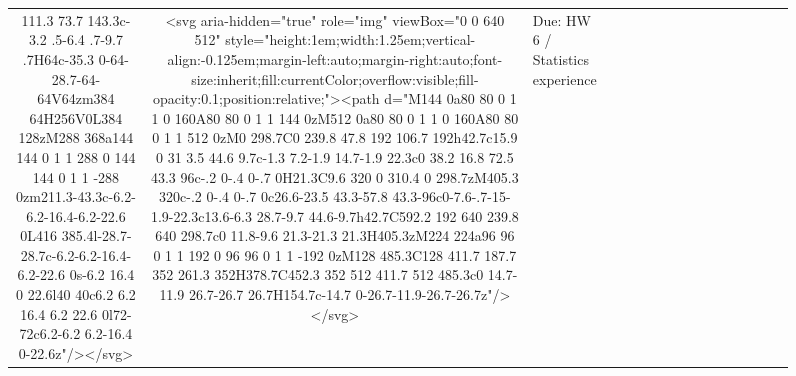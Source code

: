 \documentclass[
]{article}
\begin{document}
\begin{figure*}
\begin{longtable*}{cclllccccccccccl}
111.3 73.7 143.3c-3.2 .5-6.4 .7-9.7 .7H64c-35.3 0-64-28.7-64-64V64zm384 64H256V0L384 128zM288 368a144 144 0 1 1 288 0 144 144 0 1 1 -288 0zm211.3-43.3c-6.2-6.2-16.4-6.2-22.6 0L416 385.4l-28.7-28.7c-6.2-6.2-16.4-6.2-22.6 0s-6.2 16.4 0 22.6l40 40c6.2 6.2 16.4 6.2 22.6 0l72-72c6.2-6.2 6.2-16.4 0-22.6z"/></svg> & <svg aria-hidden="true" role="img" viewBox="0 0 640 512" style="height:1em;width:1.25em;vertical-align:-0.125em;margin-left:auto;margin-right:auto;font-size:inherit;fill:currentColor;overflow:visible;fill-opacity:0.1;position:relative;"><path d="M144 0a80 80 0 1 1 0 160A80 80 0 1 1 144 0zM512 0a80 80 0 1 1 0 160A80 80 0 1 1 512 0zM0 298.7C0 239.8 47.8 192 106.7 192h42.7c15.9 0 31 3.5 44.6 9.7c-1.3 7.2-1.9 14.7-1.9 22.3c0 38.2 16.8 72.5 43.3 96c-.2 0-.4 0-.7 0H21.3C9.6 320 0 310.4 0 298.7zM405.3 320c-.2 0-.4 0-.7 0c26.6-23.5 43.3-57.8 43.3-96c0-7.6-.7-15-1.9-22.3c13.6-6.3 28.7-9.7 44.6-9.7h42.7C592.2 192 640 239.8 640 298.7c0 11.8-9.6 21.3-21.3 21.3H405.3zM224 224a96 96 0 1 1 192 0 96 96 0 1 1 -192 0zM128 485.3C128 411.7 187.7 352 261.3 352H378.7C452.3 352 512 411.7 512 485.3c0 14.7-11.9 26.7-26.7 26.7H154.7c-14.7 0-26.7-11.9-26.7-26.7z"/></svg> & Due: HW 6 / Statistics experience \\ 

\end{longtable*}
\end{figure*}
\end{document}
